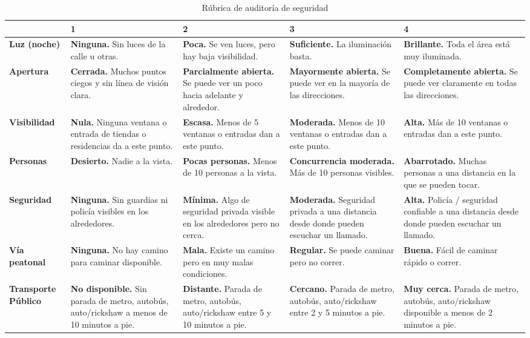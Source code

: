\begin{table}[htbp]
\centering
\footnotesize
\caption{Rúbrica de auditoría de seguridad}
\label{cuadro:safeti_pin_rubric}
\begin{tabular}{|p{2cm}|p{2.7cm}|p{2.7cm}|p{2.7cm}|p{2.7cm}|}
\hline
& \textbf{1} & \textbf{2} & \textbf{3} & \textbf{4} \\ \hline
\textbf{Luz (noche)} & \textbf{Ninguna.} Sin luces de la calle u otras. & \textbf{Poca.} Se ven luces, pero hay baja visibilidad. & \textbf{Suficiente.} La iluminación basta. & \textbf{Brillante.} Toda el área está muy iluminada. \\ \hline
\textbf{Apertura} & \textbf{Cerrada.} Muchos puntos ciegos y sin línea de visión clara. & \textbf{Parcialmente abierta.} Se puede ver un poco hacia adelante y alrededor. & \textbf{Mayormente abierta.} Se puede ver en la mayoría de las direcciones. & \textbf{Completamente abierta.} Se puede ver claramente en todas las direcciones. \\ \hline
\textbf{Visibilidad} & \textbf{Nula.} Ninguna ventana o entrada de tiendas o residencias da a este punto. & \textbf{Escasa.} Menos de 5 ventanas o entradas dan a este punto. & \textbf{Moderada.} Menos de 10 ventanas o entradas dan a este punto. & \textbf{Alta.} Más de 10 ventanas o entradas dan a este punto. \\ \hline
\textbf{Personas} & \textbf{Desierto.} Nadie a la vista. & \textbf{Pocas personas.} Menos de 10 personas a la vista. & \textbf{Concurrencia moderada.} Más de 10 personas visibles. & \textbf{Abarrotado.} Muchas personas a una distancia en la que se pueden tocar. \\ \hline
\textbf{Seguridad} & \textbf{Ninguna.} Sin guardias ni policía visibles en los alrededores. & \textbf{Mínima.} Algo de seguridad privada visible en los alrededores pero no cerca. & \textbf{Moderada.} Seguridad privada a una distancia desde donde pueden escuchar un llamado. & \textbf{Alta.} Policía / seguridad confiable a una distancia desde donde pueden escuchar un llamado. \\ \hline
\textbf{Vía peatonal} & \textbf{Ninguna.} No hay camino para caminar disponible. & \textbf{Mala.} Existe un camino pero en muy malas condiciones. & \textbf{Regular.} Se puede caminar pero no correr. & \textbf{Buena.} Fácil de caminar rápido o correr. \\ \hline
\textbf{Transporte Público} & \textbf{No disponible.} Sin parada de metro, autobús, auto/rickshaw a menos de 10 minutos a pie. & \textbf{Distante.} Parada de metro, autobús, auto/rickshaw entre 5 y 10 minutos a pie. & \textbf{Cercano.} Parada de metro, autobús, auto/rickshaw entre 2 y 5 minutos a pie. & \textbf{Muy cerca.} Parada de metro, autobús, auto/rickshaw disponible a menos de 2 minutos a pie. \\ \hline

\end{tabular}
\end{table}
